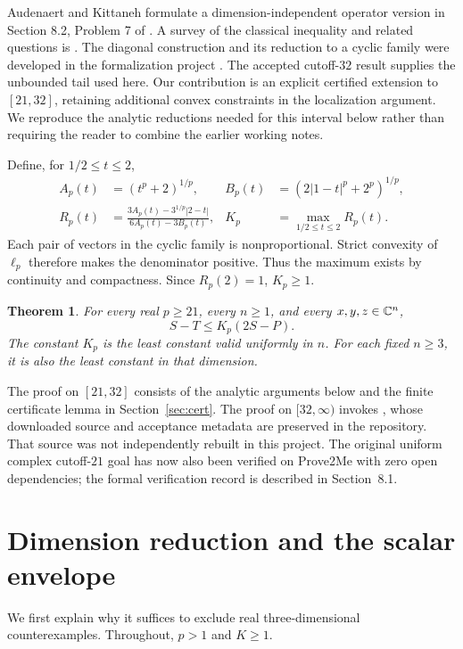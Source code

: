 \documentclass[11pt,a4paper]{article}
\newtheorem{theorem}{Theorem}[section]
\theoremstyle{remark}\newtheorem{remark}[theorem]{Remark}
\begin{document}
Audenaert and Kittaneh formulate a dimension-independent operator version
in Section 8.2, Problem 7 of \cite{AK}. A survey of the classical inequality
and related questions is \cite{MN}. The diagonal construction and its
reduction to a cyclic family were developed in the formalization project
\cite{savarin}. The accepted cutoff-$32$ result
\cite{campaign,solution32} supplies the unbounded tail used here.
Our contribution is an explicit certified extension to $[21,32]$, retaining
additional convex constraints in the localization argument. We reproduce
the analytic reductions needed for this interval below rather than requiring
the reader to combine the earlier working notes.

Define, for $1/2\le t\le2$,
\begin{align}
A_p(t)&=(t^p+2)^{1/p},&B_p(t)&=(2|1-t|^p+2^p)^{1/p},\nonumber\\
R_p(t)&=\frac{3A_p(t)-3^{1/p}|2-t|}{6A_p(t)-3B_p(t)},&
K_p&=\max_{1/2\le t\le2}R_p(t).\label{eq:cyclic}
\end{align}
Each pair of vectors in the cyclic family is nonproportional. Strict
convexity of $\ell_p$ therefore makes the denominator positive. Thus the
maximum exists by continuity and compactness. Since $R_p(2)=1$, $K_p\ge1$.

\begin{theorem}\label{thm:main}
For every real $p\ge21$, every $n\ge1$, and every $x,y,z\in\mathbb C^n$,
\begin{equation}\label{eq:main} S-T\le K_p(2S-P).\end{equation}
The constant $K_p$ is the least constant valid uniformly in $n$.
For each fixed $n\ge3$, it is also the least constant in that dimension.
\end{theorem}
The proof on $[21,32]$ consists of the analytic arguments below and the
finite certificate lemma in Section~\ref{sec:cert}. The proof on $[32,\infty)$
invokes \cite{solution32}, whose downloaded source and acceptance metadata
are preserved in the repository. That source was not independently rebuilt
in this project. The original uniform complex cutoff-$21$ goal has now
also been verified on Prove2Me with zero open dependencies; the formal
verification record is described in Section~8.1.

\section{Dimension reduction and the scalar envelope}\label{sec:reduce}
We first explain why it suffices to exclude real three-dimensional
counterexamples. Throughout, $p>1$ and $K\ge1$.
\end{document}
